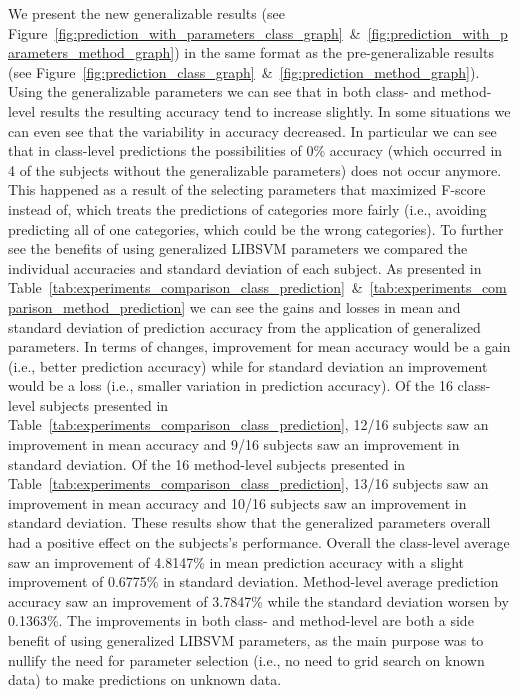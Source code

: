 We present the new generalizable results (see Figure~\ref{fig:prediction_with_parameters_class_graph}~\&~\ref{fig:prediction_with_parameters_method_graph}) in the same format as the pre-generalizable results (see Figure~\ref{fig:prediction_class_graph}~\&~\ref{fig:prediction_method_graph}). Using the generalizable parameters we can see that in both class- and method-level results the resulting accuracy tend to increase slightly. In some situations we can even see that the variability in accuracy decreased. In particular we can see that in class-level predictions the possibilities of 0\% accuracy (which occurred in 4 of the subjects without the generalizable parameters) does not occur anymore. This happened as a result of the selecting parameters that maximized F-score instead of, which treats the predictions of categories more fairly (i.e., avoiding predicting all of one categories, which could be the wrong categories). To further see the benefits of using generalized LIBSVM parameters we compared the individual accuracies and standard deviation of each subject. As presented in Table~\ref{tab:experiments_comparison_class_prediction}~\&~\ref{tab:experiments_comparison_method_prediction} we can see the gains and losses in mean and standard deviation of prediction accuracy from the application of generalized parameters. In terms of changes, improvement for mean accuracy would be a gain (i.e., better prediction accuracy) while for standard deviation an improvement would be a loss (i.e., smaller variation in prediction accuracy). Of the 16 class-level subjects presented in Table~\ref{tab:experiments_comparison_class_prediction}, 12/16 subjects saw an improvement in mean accuracy and 9/16 subjects saw an improvement in standard deviation. Of the 16 method-level subjects presented in Table~\ref{tab:experiments_comparison_class_prediction}, 13/16 subjects saw an improvement in mean accuracy and 10/16 subjects saw an improvement in standard deviation. These results show that the generalized parameters overall had a positive effect on the subjects's performance. Overall the class-level average saw an improvement of 4.8147\% in mean prediction accuracy with a slight improvement of 0.6775\% in standard deviation. Method-level average prediction accuracy saw an improvement of 3.7847\% while the standard deviation worsen by 0.1363\%. The improvements in both class- and method-level are both a side benefit of using generalized LIBSVM parameters, as the main purpose was to nullify the need for parameter selection (i.e., no need to grid search on known data) to make predictions on unknown data.


